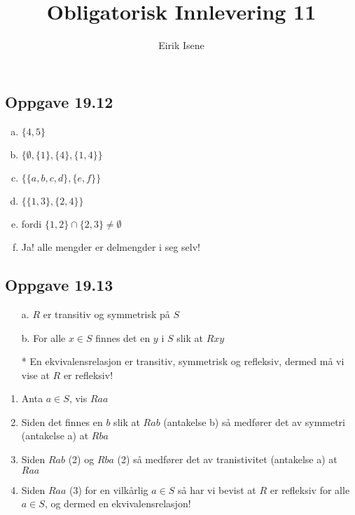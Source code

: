 \documentclass[norsk, 12p]{article}
\title{Obligatorisk Innlevering 11}
\author{Eirik Isene}
\begin{document}
\maketitle

\subsection{Oppgave 19.12}
\begin{enumerate}[a)]
    \item $\{4,5\}$
    \item $\{\emptyset,\{1\},\{4\},\{1,4\}\}$
    \item $\{\{a,b,c,d\},\{e,f\}\}$
    \item $\{\{1,3\},\{2,4\}\}$
    \item fordi $\{1,2\}\cap\{2,3\} \neq \emptyset$
    \item Ja! alle mengder er delmengder i seg selv!
\end{enumerate}

\subsection{Oppgave 19.13}
\begin{itemize}
    \item[a.] $R$ er transitiv og symmetrisk på $S$
    \item[b.] For alle $x \in S$ finnes det en $y$ i $S$ slik at $Rxy$
    \item[ * ] En ekvivalensrelasjon er transitiv, symmetrisk og refleksiv, dermed må vi vise at $R$ er refleksiv!
\end{itemize}
\begin{enumerate}
    \item Anta $a \in S$, vis $Raa$
    \item Siden det finnes en $b$ slik at $Rab$ (antakelse b) så medfører det av symmetri (antakelse a) at $Rba$
    \item Siden $Rab$ (2) og $Rba$ (2) så medfører det av tranistivitet (antakelse a) at $Raa$
    \item Siden $Raa$ (3) for en vilkårlig $a \in S$ så har vi bevist at $R$ er refleksiv for alle $a \in S$, og dermed en ekvivalensrelasjon!
\end{enumerate}
\end{document}
